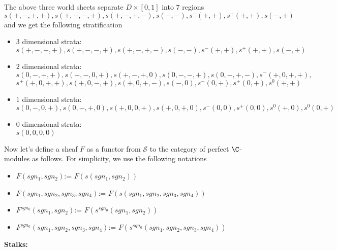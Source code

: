 The above three world sheets separate $D\times [0,1]$ into $7$ regions
\[
	s(+,-,+,+),s(+,-,-,+),s(+,-,+,-),s(-,-),s^-(+,+),s^+(+,+),s(-,+)
\]
and we get the following stratification
\begin{itemize}
\item $3$ dimensional strata: \\$s(+,-,+,+),s(+,-,-,+),s(+,-,+,-),s(-,-),s^-(+,+),s^+(+,+),s(-,+)$

\item $2$ dimensional strata: \\$s(0,-,+,+),s(+,-,0,+),s(+,-,+,0),s(0,-,-,+),s(0,-,+,-),s^-(+,0,+,+),$\\
$s^+(+,0,+,+),s(+,0,-,+),s(+,0,+,-),s(-,0),s^-(0,+),s^+(0,+),s^0(+,+)$

\item $1$ dimensional strata: \\$s(0,-,0,+),s(0,-,+,0),s(+,0,0,+),s(+,0,+,0),s^-(0,0),s^+(0,0),s^0(+,0),s^0(0,+)$

\item $0$ dimensional strata: \\ $s(0,0,0,0)$
\end{itemize}
Now let's define a sheaf $F$ as a functor from $\mathcal{S}$ to the category of perfect $\C$-modules as follows. For simplicity, we use the following notations
\begin{itemize}
\item $F(sgn_1,sgn_2)$:= $F(s(sgn_1,sgn_2))$
\item $F(sgn_1,sgn_2,sgn_3,sgn_4)$:= $F(s(sgn_1,sgn_2,sgn_3,sgn_4))$
\item $F^{sgn_0}(sgn_1,sgn_2)$:= $F(s^{sgn_0}(sgn_1,sgn_2))$
\item $F^{sgn_0}(sgn_1,sgn_2,sgn_3,sgn_4)$:= $F(s^{sgn_0}(sgn_1,sgn_2,sgn_3,sgn_4))$
\end{itemize}
\textbf{Stalks:}
